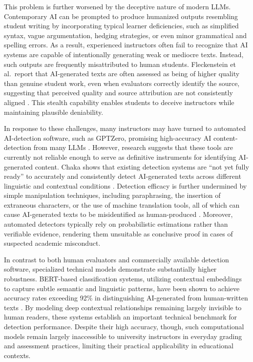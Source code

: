 \documentclass[12pt]{article}
\begin{document}
This problem is further worsened by the deceptive nature of modern LLMs. Contemporary AI can be prompted to produce humanized outputs resembling student writing by incorporating typical learner deficiencies, such as simplified syntax, vague argumentation, hedging strategies, or even minor grammatical and spelling errors. As a result, experienced instructors often fail to recognize that AI systems are capable of intentionally generating weak or mediocre texts. Instead, such outputs are frequently misattributed to human students. Fleckenstein et al.\ report that AI-generated texts are often assessed as being of higher quality than genuine student work, even when evaluators correctly identify the source, suggesting that perceived quality and source attribution are not consistently aligned \autocite[2]{fleckenstein_teachers_2024}. This stealth capability enables students to deceive instructors while maintaining plausible deniability.

In response to these challenges, many instructors may have turned to automated AI-detection software, such as GPTZero, promising high-accuracy AI content-detection from many LLMs \autocite{noauthor_gptzero_nodate}. However, research suggests that these tools are currently not reliable enough to serve as definitive instruments for identifying AI-generated content. Chaka shows that existing detection systems are \enquote{not yet fully ready} to accurately and consistently detect AI-generated texts across different linguistic and contextual conditions \autocite[10]{chaka_detecting_2023}. Detection efficacy is further undermined by simple manipulation techniques, including paraphrasing, the insertion of extraneous characters, or the use of machine translation tools, all of which can cause AI-generated texts to be misidentified as human-produced \autocite[8--9]{chaka_detecting_2023}. Moreover, automated detectors typically rely on probabilistic estimations rather than verifiable evidence, rendering them unsuitable as conclusive proof in cases of suspected academic misconduct.

In contrast to both human evaluators and commercially available detection software, specialized technical models demonstrate substantially higher robustness. BERT-based classification systems, utilizing contextual embeddings to capture subtle semantic and linguistic patterns, have been shown to achieve accuracy rates exceeding 92\% in distinguishing AI-generated from human-written texts \autocite[6]{walker_text_2024}. By modeling deep contextual relationships remaining largely invisible to human readers, these systems establish an important technical benchmark for detection performance. Despite their high accuracy, though, such computational models remain largely inaccessible to university instructors in everyday grading and assessment practices, limiting their practical applicability in educational contexts.
\end{document}
